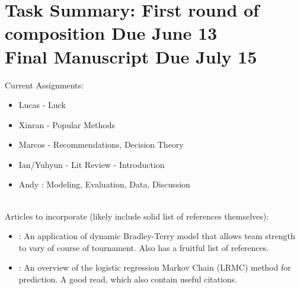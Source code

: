 \section*{Task Summary: First round of composition Due June 13\\
Final Manuscript Due July 15}

Current Assignments:
\begin{itemize}
\item Lucas - Luck
\item Xinran - Popular Methods
\item Marcos - Recommendations, Decision Theory
\item Ian/Yuhyun - Lit Review - Introduction
\item Andy : Modeling, Evaluation, Data, Discussion
\end{itemize}

\\
Articles to incorporate (likely include solid list of references themselves):
\begin{itemize}
\item \cite{cattelan2013}: An application of dynamic Bradley-Terry model that allows team strength to vary of course of tournament.  Also has a fruitful list of references.
\item \cite{Kvam2006}: An overview of the logistic regression Markov Chain (LRMC) method for prediction.  A good read, which also contain useful citations.
\end{itemize}
